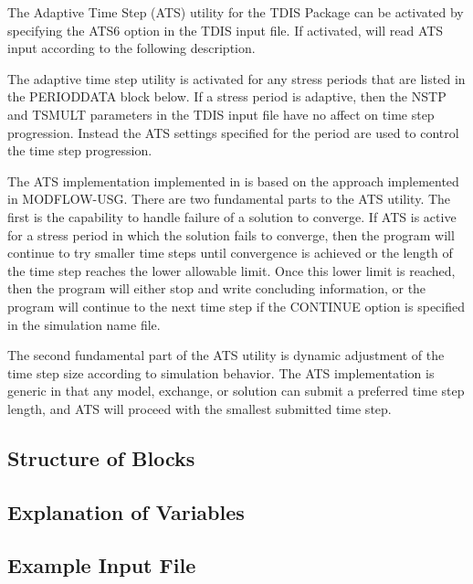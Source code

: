 The Adaptive Time Step (ATS) utility for the TDIS Package can be activated by specifying the ATS6 option in the TDIS input file.  If activated, \mf will read ATS input according to the following description.

The adaptive time step utility is activated for any stress periods that are listed in the PERIODDATA block below.  If a stress period is adaptive, then the NSTP and TSMULT parameters in the TDIS input file have no affect on time step progression.  Instead the ATS settings specified for the period are used to control the time step progression.

The ATS implementation implemented in \mf is based on the approach implemented in MODFLOW-USG.  There are two fundamental parts to the ATS utility.  The first is the capability to handle failure of a solution to converge.  If ATS is active for a stress period in which the solution fails to converge, then the program will continue to try smaller time steps until convergence is achieved or the length of the time step reaches the lower allowable limit.  Once this lower limit is reached, then the program will either stop and write concluding information, or the program will continue to the next time step if the CONTINUE option is specified in the simulation name file.

The second fundamental part of the ATS utility is dynamic adjustment of the time step size according to simulation behavior.  The ATS implementation is generic in that any model, exchange, or solution can submit a preferred time step length, and ATS will proceed with the smallest submitted time step.

\vspace{5mm}
\subsection{Structure of Blocks}
%



\vspace{5mm}
\subsection{Explanation of Variables}
\begin{description}

\end{description}

\vspace{5mm}
\subsection{Example Input File}


